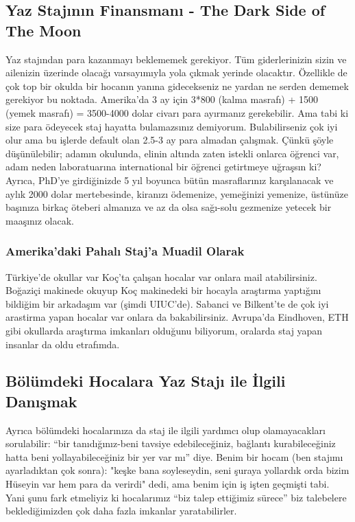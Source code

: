 \documentclass[12pt]{article}
\begin{document}
\subsection{Yaz Stajının Finansmanı - The Dark Side of The Moon}
Yaz stajından para kazanmayı beklememek gerekiyor. Tüm giderlerinizin sizin ve ailenizin üzerinde olacağı varsayımıyla yola çıkmak yerinde olacaktır. Özellikle de çok top bir okulda bir hocanın yanına gidecekseniz ne yardan ne serden dememek gerekiyor bu noktada. Amerika’da 3 ay için 3*800 (kalma masrafı) + 1500 (yemek masrafı) = 3500-4000 dolar civarı para ayırmanız gerekebilir. Ama tabi ki size para ödeyecek staj hayatta bulamazsınız demiyorum. Bulabilirseniz çok iyi olur ama bu işlerde default olan 2.5-3 ay para almadan çalışmak. Çünkü şöyle düşünülebilir;  adamın okulunda, elinin altında zaten istekli onlarca öğrenci var, adam neden laboratuarına international bir öğrenci getirtmeye uğraşsın ki? Ayrıca, PhD’ye girdiğinizde 5 yıl boyunca bütün masraflarınız karşılanacak ve aylık 2000 dolar mertebesinde, kiranızı ödemenize, yemeğinizi yemenize, üstünüze başınıza birkaç öteberi almanıza ve az da olsa sağı-solu gezmenize yetecek bir maaşınız olacak.

\subsubsection{Amerika’daki Pahalı Staj’a Muadil Olarak}
Türkiye’de okullar var Koç'ta çalışan hocalar var onlara mail atabilirsiniz. Boğaziçi makinede okuyup Koç makinedeki bir hocayla araştırma yaptığını bildiğim bir arkadaşım var (şimdi UIUC’de). Sabanci ve Bilkent'te de çok iyi arastirma yapan hocalar var onlara da bakabilirsiniz. Avrupa’da Eindhoven, ETH gibi okullarda araştırma imkanları olduğunu biliyorum, oralarda staj yapan insanlar da oldu etrafımda.

\subsection{Bölümdeki Hocalara Yaz Stajı ile İlgili Danışmak}
Ayrıca bölümdeki hocalarınıza da staj ile ilgili yardımcı olup olamayacakları sorulabilir: “bir tanıdığınız-beni tavsiye edebileceğiniz, bağlantı kurabileceğiniz hatta beni yollayabileceğiniz bir yer var mı” diye. Benim bir hocam (ben stajımı ayarladıktan çok sonra): "keşke bana soyleseydin, seni şuraya yollardık orda bizim Hüseyin var hem para da verirdi" dedi, ama benim için iş işten geçmişti tabi. Yani şunu fark etmeliyiz ki hocalarımız “biz talep ettiğimiz sürece” biz talebelere beklediğimizden çok daha fazla imkanlar yaratabilirler.
\end{document}

